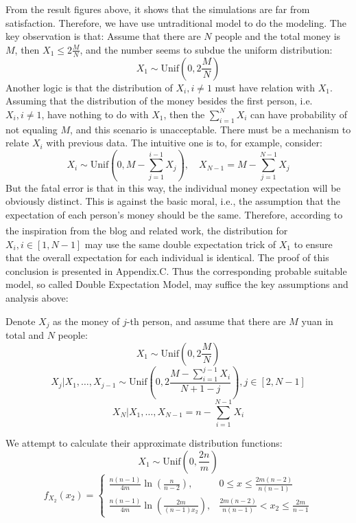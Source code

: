 \documentclass[11pt]{article}
\begin{document}
    From the result figures above, it shows that the simulations are far
from satisfaction. Therefore, we have use untraditional model to do the
modeling.
The key observation is that: Assume that there are \(N\)
people and the total money is \(M\), then \(X_1 \leq 2\frac{M}{N}\), and
the number seems to subdue the uniform distribution:
\[
X_1 \sim \text{Unif}(0, 2\frac{M}{N})
\]
Another logic is that the distribution of \(X_i, i \neq 1\) must have
relation with \(X_1\). Assuming that the distribution of the money
besides the first person, i.e.~\(X_i, i \neq 1\), have nothing to do
with \(X_1\), then the \(\sum_{i=1}^N X_i\) can have probability of not
equaling \(M\), and this scenario is unacceptable. There must be a
mechanism to relate \(X_i\) with previous data. The intuitive one is to,
for example, consider:
\[
X_i \sim \text{Unif}(0, M-\sum_{j=1}^{i-1}X_j),\quad X_{N-1} = M - \sum_{j=1}^{N-1}X_j
\]
But the fatal error is that in this way, the individual money
expectation will be obviously distinct. This is against the basic moral,
i.e., the assumption that the expectation of each person's money should
be the same. Therefore, according to the inspiration from the
blog\textsuperscript{\cite{cnblogs1}}\textsuperscript{\cite{cnblogs2}} and related work\textsuperscript{\cite{github1}}, the distribution for
\(X_i, i\in [1, N-1]\) may use the same double expectation trick of
\(X_1\) to ensure that the overall expectation for each individual is
identical. The proof of this conclusion is presented in Appendix.C. Thus
the corresponding probable suitable model, so called Double Expectation
Model, may suffice the key assumptions and analysis above:

Denote \(X_j\) as the money of \(j\)-th person, and assume that there
are \(M\) yuan in total and \(N\) people: \[
X_1 \sim \text{Unif}(0, 2\frac{M}{N})
\] \[
X_j | X_1, \dots, X_{j-1} \sim \text{Unif}(0, 2\frac{M-\sum_{i=1}^{j-1}X_i}{N+1-j}), j \in [2, N-1]
\] \[
X_N | X_1, \dots, X_{N-1} = n-\sum_{i=1}^{N-1} X_i
\]

We attempt to calculate their approximate distribution functions:
\[
X_1 \sim \text{Unif}\left(0, \frac{2n}{m}\right) 
\]
\[
f_{X_{2}}(x_2) =  
\begin{cases}  
\frac{n(n-1)}{4m} \ln\left(\frac{n}{n-2}\right), & 0 \leq x \leq \frac{2m(n-2)}{n(n-1)} \\
\frac{n(n-1)}{4m} \ln\left(\frac{2m}{(n-1)x_2}\right), & \frac{2m(n-2)}{n(n-1)} < x_2 \leq \frac{2m}{n-1}  
\end{cases}  
\]
\end{document}
